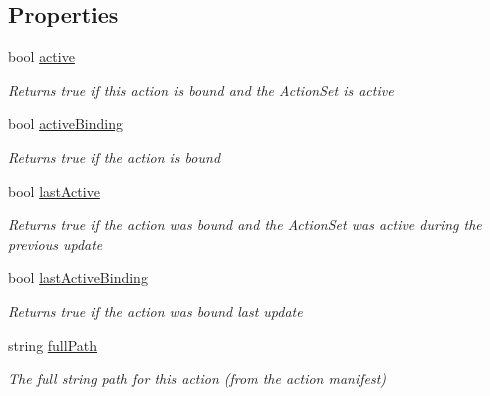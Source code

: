 \subsection*{Properties}
\begin{DoxyCompactItemize}
\item 
bool \mbox{\hyperlink{interface_valve_1_1_v_r_1_1_i_steam_v_r___action___source_a529749f5fa62c29a4faac767cd9ece8d}{active}}
\begin{DoxyCompactList}\small\item\em Returns true if this action is bound and the Action\+Set is active \end{DoxyCompactList}\item 
bool \mbox{\hyperlink{interface_valve_1_1_v_r_1_1_i_steam_v_r___action___source_a304d2c626023c9dea73f4289c57975b3}{active\+Binding}}
\begin{DoxyCompactList}\small\item\em Returns true if the action is bound \end{DoxyCompactList}\item 
bool \mbox{\hyperlink{interface_valve_1_1_v_r_1_1_i_steam_v_r___action___source_ad1f350e66dccb7f9124446967e856500}{last\+Active}}
\begin{DoxyCompactList}\small\item\em Returns true if the action was bound and the Action\+Set was active during the previous update \end{DoxyCompactList}\item 
bool \mbox{\hyperlink{interface_valve_1_1_v_r_1_1_i_steam_v_r___action___source_af78f7edb626305afcd4cbccf10e14b0f}{last\+Active\+Binding}}
\begin{DoxyCompactList}\small\item\em Returns true if the action was bound last update \end{DoxyCompactList}\item 
string \mbox{\hyperlink{interface_valve_1_1_v_r_1_1_i_steam_v_r___action___source_aecfcecacdabb3ca489a137a30f9b1728}{full\+Path}}
\begin{DoxyCompactList}\small\item\em The full string path for this action (from the action manifest) \end{DoxyCompactList}\item 

\end{DoxyCompactItemize}
